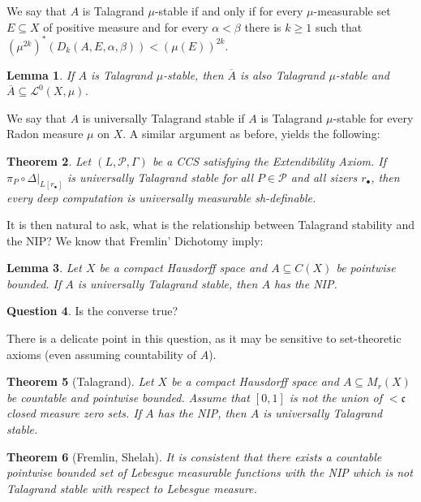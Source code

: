 \documentclass[psamsfonts]{amsart}
\newtheorem{thm}{Theorem}[section]
\newtheorem{lem}[thm]{Lemma}
\theoremstyle{definition}
\newtheorem{question}[thm]{Question}
\theoremstyle{remark}
\numberwithin{equation}{section}
\begin{document}
We say that $A$ is Talagrand $\mu$-stable if and only if for every $\mu$-measurable set $E\subseteq X$ of positive measure and for every $\alpha<\beta$ there is $k\geq 1$ such that $(\mu^{2k})^*(D_k(A,E,\alpha,\beta))<(\mu(E))^{2k}$. 

\begin{lem}
    If $A$ is Talagrand $\mu$-stable, then $\overline{A}$ is also Talagrand $\mu$-stable and $\overline{A}\subseteq\mathcal{L}^0(X,\mu)$.
\end{lem}

We say that $A$ is universally Talagrand stable if $A$ is Talagrand $\mu$-stable for every Radon measure $\mu$ on $X$. A similar argument as before, yields the following:

\begin{thm}
    Let $(L,\mathcal P,\Gamma)$ be a CCS satisfying the Extendibility Axiom. If $\pi_P\circ\Delta|_{L[r_\bullet]}$ is universally Talagrand stable for all $P\in\mathcal{P}$ and all sizers $r_{\bullet}$, then every deep computation is universally measurable sh-definable.
\end{thm}

It is then natural to ask, what is the relationship between Talagrand stability and the NIP? We know that Fremlin' Dichotomy imply:

\begin{lem}
    Let $X$ be a compact Hausdorff space and $A\subseteq C(X)$ be pointwise bounded. If $A$ is universally Talagrand stable, then $A$ has the NIP.
\end{lem}

\begin{question}
    Is the converse true?
\end{question}

There is a delicate point in this question, as it may be sensitive to set-theoretic axioms (even assuming countability of $A$).

\begin{thm}[Talagrand]
    Let $X$ be a compact Hausdorff space and $A\subseteq M_r(X)$ be countable and pointwise bounded. Assume that $[0,1]$ is not the union of $<\mathfrak{c}$ closed measure zero sets. If $A$ has the NIP, then $A$ is universally Talagrand stable.
\end{thm}

\begin{thm}[Fremlin, Shelah]
    It is consistent that there exists a countable pointwise bounded set of Lebesgue measurable functions with the NIP which is not Talagrand stable with respect to Lebesgue measure.
\end{thm}
\end{document}
